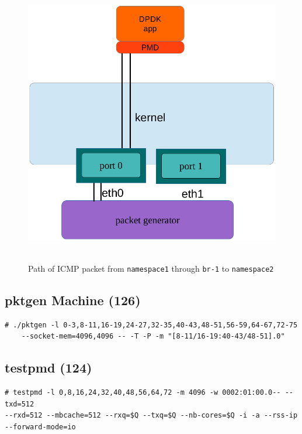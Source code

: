 \documentclass[letter]{article}
\begin{document}
{{{\begin{figure}[H]
\caption{Path of ICMP packet from \texttt{namespace1} through \texttt{br-1} to \texttt{namespace2}}
\hbox{\hspace{-0.5cm} \includegraphics[scale=0.6]{i-o-1-port} }
\end{figure}

\subsection{pktgen Machine (126)}

\begin{lstlisting}
# ./pktgen -l 0-3,8-11,16-19,24-27,32-35,40-43,48-51,56-59,64-67,72-75 
	--socket-mem=4096,4096 -- -T -P -m "[8-11/16-19:40-43/48-51].0"
\end{lstlisting}

\subsection{testpmd (124)}

\begin{lstlisting}[escapechar=!]
# testpmd -l 0,8,16,24,32,40,48,56,64,72 -m 4096 -w 0002:01:00.0-- --txd=512 
--rxd=512 --mbcache=512 --rxq=$Q --txq=$Q --nb-cores=$Q -i -a --rss-ip --forward-mode=io
\end{lstlisting}

}}}
\end{document}
